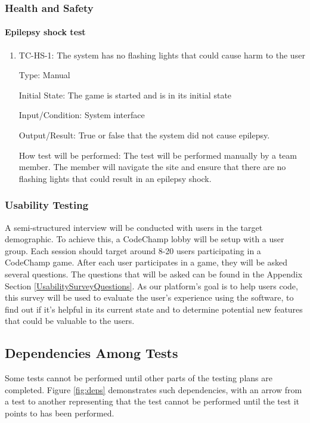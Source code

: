\documentclass[12pt, titlepage]{article}
\begin{document}
\subsubsection{Health and Safety}

\paragraph{Epilepsy shock test}
\begin{enumerate}
\item{TC-HS-1: The system has no flashing lights that could cause harm to the user}

Type: Manual
					
Initial State: The game is started and is in its initial state
					
Input/Condition: System interface
					
Output/Result: True or false that the system did not cause epilepsy.
					
How test will be performed: The test will be performed manually by a team member. The member will navigate the site and ensure that there are no flashing lights that could result in an epilepsy shock.
\end{enumerate}

\subsubsection{Usability Testing}\label{usability}

A semi-structured interview will be conducted with users in the target demographic. To achieve this, a CodeChamp lobby will be setup with a user group. Each session should target around 8-20 users participating in a CodeChamp game. After each user participates in a game, they will be asked several questions. The questions that will be asked can be found in the Appendix Section \ref{UsabilitySurveyQuestions}. As our platform's goal is to help users code, this survey will be used to evaluate the user's experience using the software, to find out if it's helpful in its current state and to determine potential new features that could be valuable to the  users.


\subsection{Dependencies Among Tests}
Some tests cannot be performed until other parts of the testing plans are completed. Figure \ref{fig:deps} demonstrates such dependencies, with an arrow from a test to another representing that the test cannot be performed until the test it points to has been performed.
\end{document}
